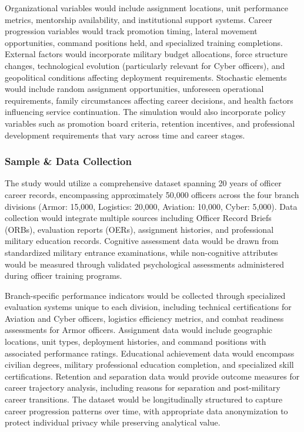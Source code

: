 \documentclass[main.tex]{subfiles}
\begin{document}
Organizational variables would include assignment locations, unit performance metrics, mentorship availability, and institutional support systems. Career progression variables would track promotion timing, lateral movement opportunities, command positions held, and specialized training completions. External factors would incorporate military budget allocations, force structure changes, technological evolution (particularly relevant for Cyber officers), and geopolitical conditions affecting deployment requirements. Stochastic elements would include random assignment opportunities, unforeseen operational requirements, family circumstances affecting career decisions, and health factors influencing service continuation. The simulation would also incorporate policy variables such as promotion board criteria, retention incentives, and professional development requirements that vary across time and career stages.

\subsubsection{Sample \& Data Collection}

The study would utilize a comprehensive dataset spanning 20 years of officer career records, encompassing approximately 50,000 officers across the four branch divisions (Armor: 15,000, Logistics: 20,000, Aviation: 10,000, Cyber: 5,000). Data collection would integrate multiple sources including Officer Record Briefs (ORBs), evaluation reports (OERs), assignment histories, and professional military education records. Cognitive assessment data would be drawn from standardized military entrance examinations, while non-cognitive attributes would be measured through validated psychological assessments administered during officer training programs.

Branch-specific performance indicators would be collected through specialized evaluation systems unique to each division, including technical certifications for Aviation and Cyber officers, logistics efficiency metrics, and combat readiness assessments for Armor officers. Assignment data would include geographic locations, unit types, deployment histories, and command positions with associated performance ratings. Educational achievement data would encompass civilian degrees, military professional education completion, and specialized skill certifications. Retention and separation data would provide outcome measures for career trajectory analysis, including reasons for separation and post-military career transitions. The dataset would be longitudinally structured to capture career progression patterns over time, with appropriate data anonymization to protect individual privacy while preserving analytical value.
\end{document}
